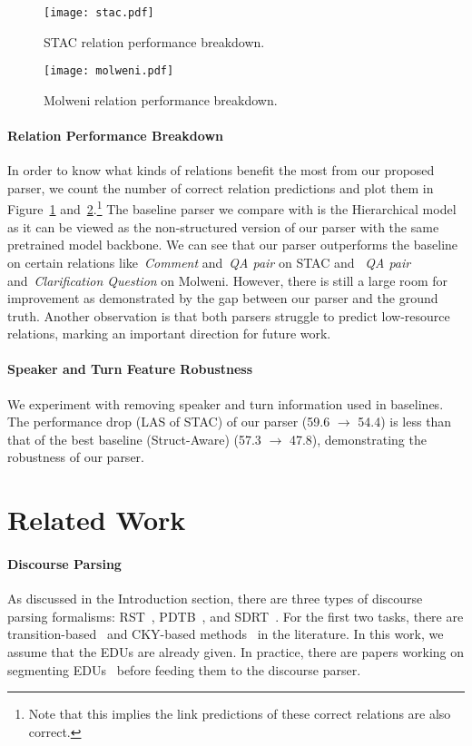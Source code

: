 \documentclass[11pt]{article}
\begin{document}
\begin{figure}[]
\texttt{[image: stac.pdf]}
\caption{STAC relation performance breakdown.}
\label{fig:stac_breakdown}
\end{figure}

\begin{figure}[]
\texttt{[image: molweni.pdf]}
\caption{Molweni relation performance breakdown.}
\label{fig:molweni_breakdown}
\end{figure}

\paragraph{Relation Performance Breakdown}
In order to know what kinds of relations benefit the most from our proposed parser, we count the number of correct relation predictions and plot them in Figure~\ref{fig:stac_breakdown} and~\ref{fig:molweni_breakdown}.\footnote{Note that this implies the link predictions of these correct relations are also correct.} The baseline parser we compare with is the Hierarchical model~\cite{liu-chen-2021-improving} as it can be viewed as the non-structured version of our parser with the same pretrained model backbone. We can see that our parser outperforms the baseline on certain relations like~\emph{Comment} and~\emph{QA pair} on STAC and ~\emph{QA pair} and~\emph{Clarification Question} on Molweni.
However, there is still a large room for improvement as demonstrated by the gap between our parser and the ground truth. Another observation is that both parsers struggle to predict low-resource relations, marking an important direction for future work.

\paragraph{Speaker and Turn Feature Robustness}
We experiment with removing speaker and turn information used in baselines. The performance drop (LAS of STAC) of our parser (59.6 $\to$ 54.4) is less than that of the best baseline (Struct-Aware) (57.3 $\to$ 47.8), demonstrating the robustness of our parser.


\section{Related Work}
\paragraph{Discourse Parsing}
As discussed in the Introduction section, there are three types of discourse parsing formalisms: RST~\cite{mann1988rhetorical}, PDTB~\cite{prasad2008penn}, and SDRT~\cite{lascarides2008segmented, asher2016discourse}.
For the first two tasks, there are transition-based~\cite{li2014text,braud2017cross,yu2018transition} and CKY-based methods~\cite{joty2015codra,li2016discourse,liu2017learning} in the literature.
In this work, we assume that the EDUs are already given. In practice, there are papers working on segmenting EDUs~\cite{subba2007automatic,li2018segbot} before feeding them to the discourse parser.
\end{document}
